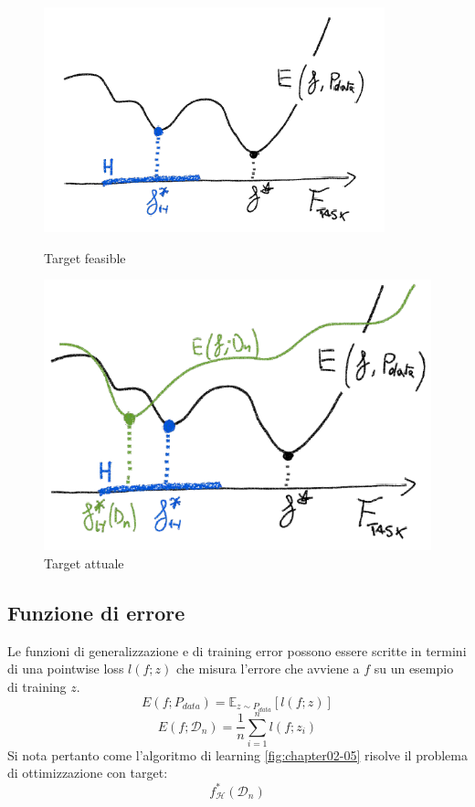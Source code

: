 \begin{figure}
	\centering
	\begin{minipage}{.5\textwidth}
		\centering
		\includegraphics[width=1\linewidth]{imgs/chapter2/img3}
		\caption{Target feasible}
		\label{fig:chapter02-03}
	\end{minipage}%
	\begin{minipage}{.5\textwidth}
		\centering
		\includegraphics[width=1\linewidth]{imgs/chapter2/img4}
		\caption{Target attuale}
		\label{fig:chapter02-04}
	\end{minipage}
\end{figure}

\subsection{Funzione di errore}
Le funzioni di generalizzazione e di training error possono essere scritte in termini di una pointwise loss $l(f;z)$ che misura l'errore che avviene a $f$ su un esempio di training $z$.
$$E(f;P_{data})=\mathbb{E}_{z\sim P_{data}}[l(f;z)]$$
$$E(f;\mathcal{D}_n)=\dfrac{1}{n}\sum\limits_{i=1}^nl(f;z_i)$$
Si nota pertanto come l'algoritmo di learning \ref{fig:chapter02-05} risolve il problema di ottimizzazione con target:
$$f^*_\mathcal{H}(\mathcal{D}_n)$$

